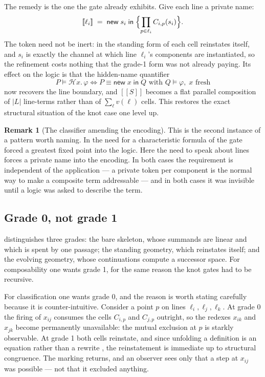 \documentclass[11pt]{article}
\theoremstyle{plain}
\theoremstyle{definition}
\newtheorem{remark}[theorem]{Remark}
\newcommand{\enc}[1]{[\![#1]\!]}
\begin{document}
The remedy is the one the gate already exhibits. Give each line a private name:
\[
\enc{\ell_i} \;=\; \mathsf{new}\; s_i \;\mathsf{in}\; \Bigl\{ \prod_{p \in \ell_i} C_{i,p}(s_i) \Bigr\}.
\]
The token need not be inert: in the standing form of \cite[\S7]{Geometry} each cell reinstates
itself, and $s_i$ is exactly the channel at which line $\ell_i$'s components are instantiated, so
the refinement costs nothing that the grade-1 form was not already paying. Its effect on the logic
is that the hidden-name quantifier
\[
P \models \mathcal{H}x.\,\varphi \iff P \equiv \mathsf{new}\;x\;\mathsf{in}\;Q \text{ with }
Q \models \varphi, \; x \text{ fresh}
\]
now recovers the line boundary, and $\enc{S}$ becomes a flat parallel composition of $|L|$
line-terms rather than of $\sum_\ell v(\ell)$ cells. This restores the exact structural situation of
the knot case one level up.

\begin{remark}[The classifier amending the encoding]
This is the second instance of a pattern worth naming. In \cite{Classifier} the need for a
characteristic formula of the gate forced a greatest fixed point into the logic. Here the need to
speak about lines forces a private name into the encoding. In both cases the requirement is
independent of the application --- a private token per component is the normal way to make a
composite term addressable --- and in both cases it was invisible until a logic was asked to
describe the term.
\end{remark}

\subsection{Grade 0, not grade 1}
\label{sec:grade}

\cite[\S7]{Geometry} distinguishes three grades: the bare skeleton, whose summands are linear and
which is spent by one passage; the standing geometry, which reinstates itself; and the evolving
geometry, whose continuations compute a successor space. For composability one wants grade 1, for
the same reason the knot gates had to be recursive.

For classification one wants grade 0, and the reason is worth stating carefully because it is
counter-intuitive. Consider a point $p$ on lines $\ell_i,\ell_j,\ell_k$. At grade 0 the firing of
$x_{ij}$ consumes the cells $C_{i,p}$ and $C_{j,p}$ outright, so the redexes $x_{ik}$ and $x_{jk}$
become permanently unavailable: the mutual exclusion at $p$ is starkly observable. At grade 1 both
cells reinstate, and since unfolding a definition is an equation rather than a rewrite
\cite[Rem.~1]{Knots}, the reinstatement is immediate up to structural congruence. The marking
returns, and an observer sees only that a step at $x_{ij}$ was possible --- not that it excluded
anything.
\end{document}
